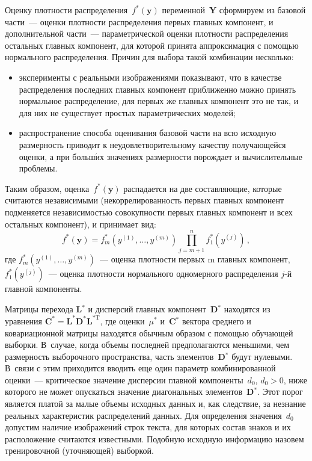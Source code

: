 \begin{multicols}{2}
      Оценку плотности распределения~$f^*(\mathbf{y})$ переменной~\textbf{Y} сформируем 
из базовой части~--- оценки плотности распределения первых главных компонент, и 
дополнительной части~--- параметрической оценки плотности распределения остальных главных 
компонент, для которой принята аппроксимация с помощью нормального распределения. Причин 
для выбора такой комбинации несколько:
      \begin{itemize}
\item эксперименты с реальными изображениями показывают, что в качестве распределения 
последних главных компонент приближенно можно принять нормальное распределение, для 
первых же главных компонент это не так, и для них не существует простых параметрических 
моделей;
\item распространение способа оценивания базовой части на всю исходную размерность 
приводит к неудовлетворительному качеству получающейся оценки, а при больш$\acute{\mbox{и}}$х 
значениях раз\-мер\-ности порождает и вычислительные проблемы.
\end{itemize}

      Таким образом, оценка~$f^*(\mathbf{y})$ распадается на две составляющие, которые 
считаются независимыми (некоррелированность первых главных компонент подменяется 
независимостью совокупности первых главных компонент и всех остальных компонент), и 
принимает вид:
      \begin{equation*}
      f^*(\mathbf{y}) =f^*_m\left ( y^{(1)}, \ldots , y^{(m)}\right ) \prod\limits_{j=m+1}^n 
f_1^*\left(y^{(j)}\right)\,,
      \end{equation*}
где $f_m^*\left( y^{(1)}, \ldots , y^{(m)}\right)$~--- оценка плотности первых m главных компонент, 
$f_1^*\left ( y^{(j)}\right)$~--- оценка плотности нормального одномерного распределения $j$-й 
главной компоненты.
      
      Матрицы перехода \textbf{L}$^*$ и дисперсий главных компонент~\textbf{D}$^*$ 
находятся из уравнения $\mathbf{C}^*=\mathbf{L}^*\mathbf{D}^*\mathbf{L}^{*\mathrm{T}}$, где 
оценки~$\mu^*$ и~\textbf{C}$^*$ вектора  среднего и ковариационной матрицы находятся обычным образом с 
помощью обучающей выборки. В~случае, когда объемы последней 
предполагаются меньшими, чем размерность выборочного пространства, часть 
элементов~\textbf{D}$^*$ будут нулевыми. В~связи с этим приходится вводить еще один 
параметр комбинированной оценки~--- критическое значение дис\-пер\-сии главной 
компоненты~$d_0$, $d_0>0$, ниже которого не может опускаться значение диагональных 
элементов~\textbf{D}$^*$. Этот порог является платой за малые объемы исходных данных и, как 
следствие, за незнание реальных характеристик распределений данных. Для определения 
значения~$d_0$ допустим наличие изоб\-ра\-же\-ний строк текста, для которых состав знаков и их 
расположение считаются известными. Подобную исходную информацию назовем тренировочной 
(уточняющей) выборкой. 


\end{multicols}

